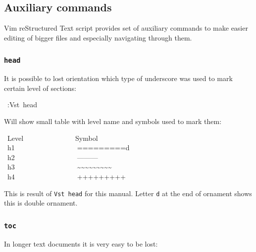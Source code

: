 \documentclass[12pt]{article}
\begin{document}
\subsection{Auxiliary commands}

Vim reStructured Text script provides set of auxiliary commands to make easier editing
of bigger files and especially navigating through them.

\hypertarget{lheaders}{}

\hypertarget{l9696head9696}{}
\subsubsection{\texttt{head}}

It is possible to lost orientation which type of underscore was used to
mark certain level of sections:

\begin{ttfamily}\begin{flushleft}
\mbox{~:Vst~head}\\
\end{flushleft}\end{ttfamily}

Will show small table with level name and symbols used to mark them:

\begin{ttfamily}\begin{flushleft}
\mbox{~Level~~~~~~~~~~~~~~~Symbol}\\
\mbox{~h1~~~~~~~~~~~~~~~~~~=========d}\\
\mbox{~h2~~~~~~~~~~~~~~~~~~---------~}\\
\mbox{~h3~~~~~~~~~~~~~~~~~~\~{}\~{}\~{}\~{}\~{}\~{}\~{}\~{}\~{}~}\\
\mbox{~h4~~~~~~~~~~~~~~~~~~+++++++++}\\
\end{flushleft}\end{ttfamily}

This is result of \texttt{Vst head} for this manual. Letter \texttt{d} at the end of
ornament shows this is double ornament.

\hypertarget{lcontents}{}

\hypertarget{l9696toc9696}{}
\subsubsection{\texttt{toc}}

In longer text documents it is very easy to be lost:
\end{document}
